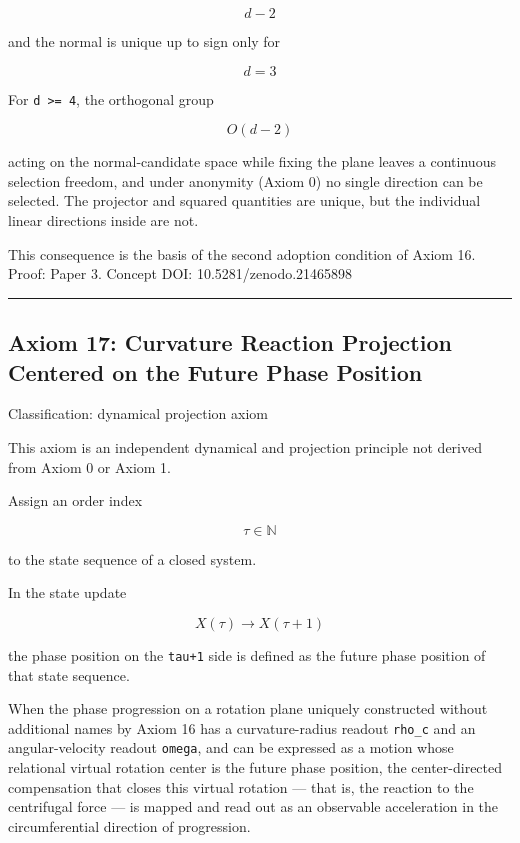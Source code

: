 \documentclass[
  a4paper,
]{article}
\begin{document}
\[
d-2
\]

and the normal is unique up to sign only for

\[
d=3
\]

For \texttt{d\ \textgreater{}=\ 4}, the orthogonal group

\[
O(d-2)
\]

acting on the normal-candidate space while fixing the plane leaves a
continuous selection freedom, and under anonymity (Axiom 0) no single
direction can be selected. The projector and squared quantities are
unique, but the individual linear directions inside are not.

This consequence is the basis of the second adoption condition of Axiom
16. Proof: Paper 3. Concept DOI: 10.5281/zenodo.21465898

\begin{center}\rule{0.5\linewidth}{0.5pt}\end{center}

\subsection{Axiom 17: Curvature Reaction Projection Centered on the
Future Phase
Position}\label{axiom-17-curvature-reaction-projection-centered-on-the-future-phase-position}

Classification: dynamical projection axiom

This axiom is an independent dynamical and projection principle not
derived from Axiom 0 or Axiom 1.

Assign an order index

\[
\tau\in\mathbb{N}
\]

to the state sequence of a closed system.

In the state update

\[
X(\tau)\longrightarrow X(\tau+1)
\]

the phase position on the \texttt{tau+1} side is defined as the future
phase position of that state sequence.

When the phase progression on a rotation plane uniquely constructed
without additional names by Axiom 16 has a curvature-radius readout
\texttt{rho\_c} and an angular-velocity readout \texttt{omega}, and can
be expressed as a motion whose relational virtual rotation center is the
future phase position, the center-directed compensation that closes this
virtual rotation --- that is, the reaction to the centrifugal force ---
is mapped and read out as an observable acceleration in the
circumferential direction of progression.
\end{document}
